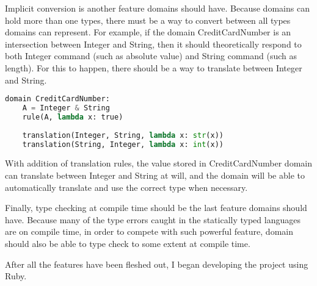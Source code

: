 Implicit conversion is another feature domains should have.  Because domains can hold more than one types, there must be a way to convert between all types domains can represent.  For example, if the domain CreditCardNumber is an intersection between Integer and String, then it should theoretically respond to both Integer command (such as absolute value) and String command (such as length).  For this to happen, there should be a way to translate between Integer and String.

\begin{lstlisting}[language=Python, caption={Domain pseudocode}]
domain CreditCardNumber:
    A = Integer & String
    rule(A, lambda x: true)
    
    translation(Integer, String, lambda x: str(x))
    translation(String, Integer, lambda x: int(x))
\end{lstlisting}

With addition of translation rules, the value stored in CreditCardNumber domain can translate between Integer and String at will, and the domain will be able to automatically translate and use the correct type when necessary.

Finally, type checking at compile time should be the last feature domains should have.  Because many of the type errors caught in the statically typed languages are on compile time, in order to compete with such powerful feature, domain should also be able to type check to some extent at compile time.

After all the features have been fleshed out, I began developing the project using Ruby.

